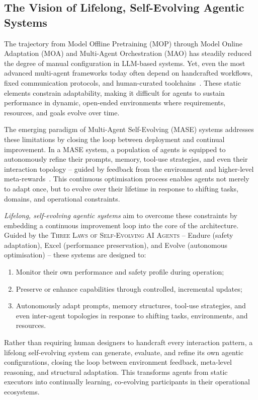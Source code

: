 \documentclass[]{selfevolagent}
\theoremstyle{plain}
\theoremstyle{definition}
\theoremstyle{remark}
\newcommand{\ThreeLaws}{{\scshape\color{selfevolagent_dark!120} Three Laws of Self-Evolving AI Agents}}
\begin{document}
\subsection{The Vision of Lifelong, Self-Evolving Agentic Systems}
\label{subsec:vision}
The trajectory from Model Offline Pretraining (MOP) through Model Online Adaptation (MOA) and Multi-Agent Orchestration (MAO) has steadily reduced the degree of manual configuration in LLM-based systems. Yet, even the most advanced multi-agent frameworks today often depend on handcrafted workflows, fixed communication protocols, and human-curated toolchains~\citep{talebirad2023multi,zhao2024expel,luo2025large,tran2025multi}. These static elements constrain adaptability, making it difficult for agents to sustain performance in dynamic, open-ended environments where requirements, resources, and goals evolve over time.

The emerging paradigm of Multi-Agent Self-Evolving (MASE) systems addresses these limitations by closing the loop between deployment and continual improvement. In a MASE system, a population of agents is equipped to autonomously refine their prompts, memory, tool-use strategies, and even their interaction topology -- guided by feedback from the environment and higher-level meta-rewards~\citep{novikov2025alphaevolve,zhang2025darwin}. This continuous optimisation process enables agents not merely to adapt once, but to evolve over their lifetime in response to shifting tasks, domains, and operational constraints.

\textit{Lifelong, self-evolving agentic systems} aim to overcome these constraints by embedding a continuous improvement loop into the core of the architecture. Guided by the \ThreeLaws{} -- Endure (safety adaptation), Excel (performance preservation), and Evolve (autonomous optimisation) -- these systems are designed to:
\begin{enumerate}[label=(\Roman*)]
\item Monitor their own performance and safety profile during operation;
\item Preserve or enhance capabilities through controlled, incremental updates;
\item Autonomously adapt prompts, memory structures, tool-use strategies, and even inter-agent topologies in response to shifting tasks, environments, and resources.
\end{enumerate}

Rather than requiring human designers to handcraft every interaction pattern, a lifelong self-evolving system can generate, evaluate, and refine its own agentic configurations, closing the loop between environment feedback, meta-level reasoning, and structural adaptation. This transforms agents from static executors into continually learning, co-evolving participants in their operational ecosystems.
\end{document}
